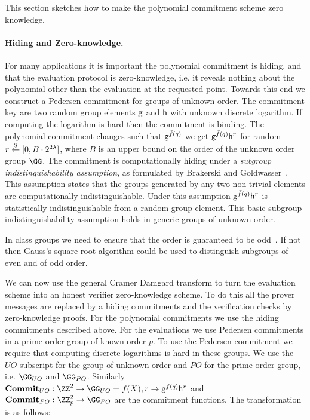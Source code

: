This section sketches how to make the polynomial commitment scheme zero knowledge. 

\paragraph{Hiding and Zero-knowledge.} For many applications it is important the polynomial commitment is hiding, and that the evaluation protocol is zero-knowledge, i.e. it reveals nothing about the polynomial other than the evaluation at the requested point.
Towards this end we construct a Pedersen commitment for groups of unknown order.
The commitment key are two random group elements $\mathsf{g}$ and $\mathsf{h}$ with unknown discrete logarithm. If computing the logarithm is hard then the commitment is binding.
 The polynomial commitment changes such that $\mathsf{g}^{\bar{f}(q)}$ we get $\mathsf{g}^{\bar{f}(q)}\mathsf{h}^{r}$ for random $r \overset{\$}{\gets} [0, B\cdot 2^{2\lambda}]$, where $B$ is an upper bound on the order of the unknown order group $\GG$.  
The commitment is computationally hiding under a \emph{subgroup indistinguishability assumption}, as formulated by Brakerski and Goldwasser~\cite{C:BraGol10}. This assumption states that the groups generated by any two non-trivial elements are computationally indistinguishable. Under this assumption $\mathsf{g}^{\bar{f}(q)}\mathsf{h}^r$ is statistically indistinguishable from a random group element.
This basic subgroup indistinguishability assumption holds in generic groups of unknown order. 

In class groups we need to ensure that the order is guaranteed to be odd~\cite{PKC/BucHam01}. If not then Gauss's square root algorithm could be used to distinguish subgroups of even and of odd order.

We can now use the general Cramer Damgard\cite{C:CraDam98} transform to turn the evaluation scheme into an honest verifier zero-knowledge scheme.  
To do this all the prover messages are replaced by a hiding commitments and the verification checks by zero-knowledge proofs. For the polynomial commitments we use the hiding commitments described above. For the evaluations we use Pedersen commitments\cite{C:Pedersen91} in a prime order group of known order $p$. To use the Pedersen commitment we require that computing discrete logarithms is hard in these groups. 
We use the ${UO}$ subscript for the group of unknown order and $PO$ for the prime order group, i.e. $\GG_{UO}$ and $\GG_{PO}$.
Similarly $\commit_{UO}:\ZZ^2 \rightarrow\GG_{UO}=f(X),r \rightarrow \gr{g}^{f(q)}\gr{h}^{r}$ and $\commit_{PO}:\ZZ_p^2\rightarrow \GG_{PO}$ are the commitment functions.
The transformation is as follows: 

